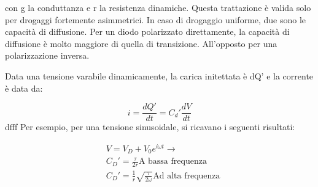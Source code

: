 \documentclass{article}
\begin{document}
con g la conduttanza e r la resistenza dinamiche.
Questa trattazione è valida solo per drogaggi fortemente asimmetrici. In caso di drogaggio uniforme, due sono le capacità di diffusione.
Per un diodo polarizzato direttamente, la capacità di diffusione è molto maggiore di quella di transizione. All'opposto per una polarizzazione inversa.

Data una tensione varabile dinamicamente, la carica initettata è dQ' e la corrente è data da:

\begin{equation}
    i=\frac{dQ'}{dt}=C_d' \frac{dV}{dt}
\end{equation}
dfff
Per esempio, per una tensione sinusoidale, si ricavano i seguenti risultati:

\begin{equation}
    \begin{aligned}
         & V=V_D+V_0e^{i\omega t} \rightarrow                                   \\
         & C_D'= \frac{\tau}{2r} \text{A bassa frequenza}                       \\
         & C_D'=\frac{1}{r}\sqrt{\frac{\tau}{2\omega}} \text{Ad alta frequenza}
    \end{aligned}
\end{equation}
\end{document}
